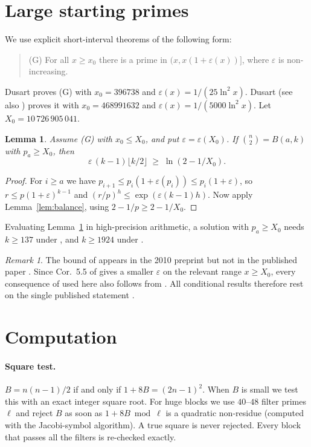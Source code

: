 \documentclass[11pt]{article}
\newtheorem{lemma}[theorem]{Lemma}
\theoremstyle{remark}
\newtheorem{remark}[theorem]{Remark}
\newcommand{\binomtwo}[1]{\binom{#1}{2}}
\begin{document}
\section{Large starting primes}

We use explicit short-interval theorems of the following form:
\begin{quote}
(G) For all $x \ge x_0$ there is a prime in $(x, x(1+\varepsilon(x))]$, where
$\varepsilon$ is non-increasing.
\end{quote}
Dusart \cite[Prop.~6.8]{D10} proves (G) with $x_0 = 396738$ and
$\varepsilon(x) = 1/(25\ln^2 x)$. Dusart \cite[Cor.~5.5]{D18} (see also \cite{Ax}) proves it
with $x_0 = 468991632$ and $\varepsilon(x) = 1/(5000\ln^2 x)$. Let
$X_0 = 10\,726\,905\,041$.

\begin{lemma}\label{lem:tail}
Assume (G) with $x_0 \le X_0$, and put $\varepsilon = \varepsilon(X_0)$. If
$\binomtwo{n} = B(a,k)$ with $p_a \ge X_0$, then
\[
\varepsilon\,(k-1)\lfloor k/2\rfloor \;\ge\; \ln(2 - 1/X_0).
\]
\end{lemma}
\begin{proof}
For $i \ge a$ we have $p_{i+1} \le p_i(1+\varepsilon(p_i)) \le p_i(1+\varepsilon)$, so
$r \le p(1+\varepsilon)^{k-1}$ and $(r/p)^{h} \le \exp(\varepsilon(k-1)h)$. Now apply
Lemma~\ref{lem:balance}, using $2 - 1/p \ge 2 - 1/X_0$.
\end{proof}

Evaluating Lemma~\ref{lem:tail} in high-precision arithmetic, a solution with
$p_a \ge X_0$ needs $k \ge 137$ under \cite{D10}, and $k \ge 1924$ under \cite{D18}.

\begin{remark}
The bound of \cite{D10} appears in the 2010 preprint but not in the published paper
\cite{D18}. Since Cor.~5.5 of \cite{D18} gives a smaller $\varepsilon$ on the relevant range
$x \ge X_0$, every consequence of \cite{D10} used here also follows from \cite{D18}. All
conditional results therefore rest on the single published statement \cite[Cor.~5.5]{D18}.
\end{remark}

\section{Computation}

\paragraph{Square test.} $B = n(n-1)/2$ if and only if $1 + 8B = (2n-1)^2$. When $B$ is
small we test this with an exact integer square root. For huge blocks we use $40$--$48$
filter primes $\ell$ and reject $B$ as soon as $1 + 8B \bmod \ell$ is a quadratic
non-residue (computed with the Jacobi-symbol algorithm). A true square is never rejected.
Every block that passes all the filters is re-checked exactly.
\end{document}
